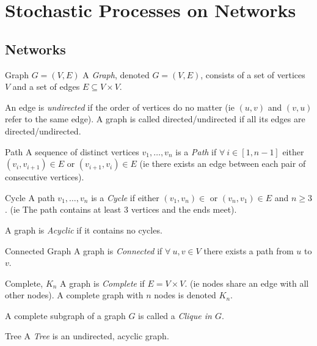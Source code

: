 \documentclass[11pt,a4paper]{article}
\begin{document}
\section{Stochastic Processes on Networks}

\subsection{Networks}

\begin{definition}{Graph $G=(V,E)$}
  A \textit{Graph}, denoted $G=(V,E)$, consists of a set of vertices $V$ and a set of edges $E\subseteq V\times V$.
  \par An edge is \textit{undirected} if the order of vertices do no matter (ie $(u,v)$ and $(v,u)$ refer to the same edge). A graph is called directed/undirected if all its edges are directed/undirected.
\end{definition}

\begin{definition}{Path}
  A sequence of distinct vertices $v_1,\dots,v_n$ is a \textit{Path} if $\forall\ i\in[1,n-1]$ either $(v_i,v_{i+1})\in E$ or $(v_{i+1},v_i)\in E$ (ie there exists an edge between each pair of consecutive vertices).
\end{definition}

\begin{definition}{Cycle}
  A path $v_1,\dots,v_n$ is a \textit{Cycle} if either $(v_1,v_n)\in $ or $(v_n,v_1)\in E$ and $n\geq3$. (ie The path contains at least 3 vertices and the ends meet).
  \par A graph is \textit{Acyclic} if it contains no cycles.
\end{definition}

\begin{definition}{Connected Graph}
  A graph is \textit{Connected} if $\forall\ u,v\in V$ there exists a path from $u$ to $v$.
\end{definition}

\begin{definition}{Complete, $K_n$}
  A graph is \textit{Complete} if $E=V\times V$. (ie nodes share an edge with all other nodes). A complete graph with $n$ nodes is denoted $K_n$.
  \par A complete subgraph of a graph $G$ is called a \textit{Clique in $G$}.
\end{definition}

\begin{definition}{Tree}
  A \textit{Tree} is an undirected, acyclic graph.
\end{definition}
\end{document}
